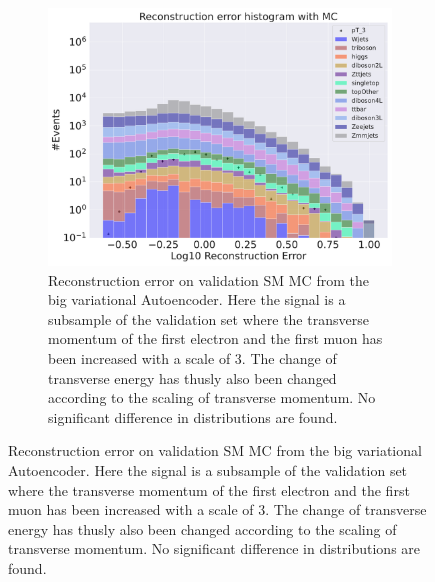 \begin{figure}[h!]
\begin{subfigure}{.45\textwidth}
        \includegraphics[width=\textwidth]{Figures/VAE_testing/big/b_data_recon_big_rm3_feats_sig_pT_3.pdf}
        \caption{Reconstruction error on validation SM MC from the big variational Autoencoder. Here the signal is a subsample of the validation 
        set where the transverse momentum of the first electron and the first muon has been increased with a scale of $3$. The change of transverse 
        energy has thusly also been changed according to the scaling of transverse momentum. No significant difference in distributions are found. }
        \label{fig:VAE_big_pt_3}
    \end{subfigure}
    \hfill 
    \label{fig:VAE_big_small_pt_3}
\end{figure}

